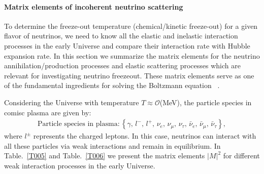 \paragraph{Matrix elements of incoherent neutrino scattering}

To determine the freeze-out temperature (chemical/kinetic freeze-out) for a given flavor of neutrinos, we need to know all the elastic and inelastic interaction processes in the early Universe and compare their interaction rate with Hubble expansion rate. In this section we summarize the matrix elements for the neutrino annihilation/production processes and elastic scattering processes which are relevant for investigating neutrino freezeout. These matrix elements serve as one of the fundamental ingredients for solving the Boltzmann equation ~\cite{Birrell:2014uka}.

Considering the Universe with temperature $T\approx\mathcal{O}$(MeV), the   particle species in comisc plasma are given by:
\begin{align}
\mathrm{Particle\,\,species\,\, in \,\,plasma:}
\left\{\gamma,\, l^-,\,l^+,\, \nu_e,\, \nu_\mu,\, \nu_\tau,\, \bar{\nu}_e,\, \bar{\nu}_\mu,\, \bar{\nu}_\tau\right\},
\end{align}
 where $l^\pm$ represents the charged leptons. In this case, neutrinos can interact with all these particles via weak interactions and remain in equilibrium. In Table.~\ref{T005} and Table.~\ref{T006} we present the matrix elements $|M|^2$ for different weak interaction processes in the early Universe.

